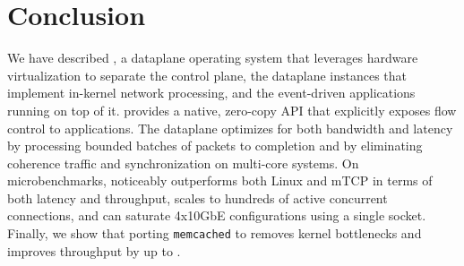 
\section{Conclusion}

We have described \ix, a dataplane operating system that leverages
hardware virtualization to separate the control plane, the \ix
dataplane instances that implement in-kernel network processing, and
the event-driven applications running on top of it.  \ix provides a
native, zero-copy API that explicitly exposes flow control to
applications. The \ix dataplane optimizes for both bandwidth and
latency by processing bounded batches of packets to completion and by
eliminating coherence traffic and synchronization on multi-core
systems. On microbenchmarks, \ix noticeably outperforms both Linux and
mTCP in terms of both latency and throughput, scales to hundreds of
active concurrent connections, and can saturate 4x10GbE configurations
using a single socket.  Finally, we show that
porting \texttt{memcached} to \ix removes kernel bottlenecks and
improves throughput by up to .


